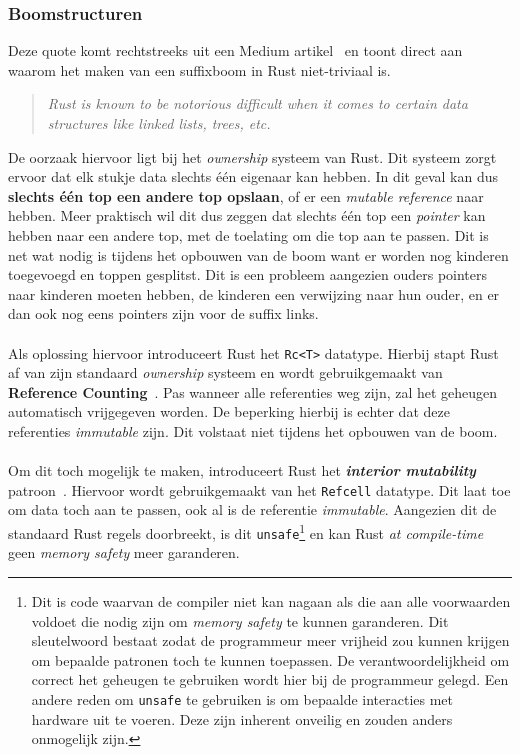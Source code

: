\subsubsection{Boomstructuren}
Deze quote komt rechtstreeks uit een Medium artikel~\cite{rust_difficulty_quote} en toont direct aan waarom het maken van een suffixboom in Rust niet-triviaal is.
\begin{quote}
    \textit{Rust is known to be notorious difficult when it comes to certain data structures like linked lists, trees, etc.}
\end{quote}
De oorzaak hiervoor ligt bij het \textit{ownership} systeem van Rust.
Dit systeem zorgt ervoor dat elk stukje data slechts één eigenaar kan hebben.
In dit geval kan dus \textbf{slechts één top een andere top opslaan}, of er een \textit{mutable reference} naar hebben.
Meer praktisch wil dit dus zeggen dat slechts één top een \textit{pointer} kan hebben naar een andere top, met de toelating om die top aan te passen.
Dit is net wat nodig is tijdens het opbouwen van de boom want er worden nog kinderen toegevoegd en toppen gesplitst.
Dit is een probleem aangezien ouders pointers naar kinderen moeten hebben, de kinderen een verwijzing naar hun ouder, en er dan ook nog eens pointers zijn voor de suffix links.
\\ \\
Als oplossing hiervoor introduceert Rust het \texttt{Rc<T>} datatype.
Hierbij stapt Rust af van zijn standaard \textit{ownership} systeem en wordt gebruikgemaakt van \textbf{Reference Counting}~\cite{reference_counting}.
Pas wanneer alle referenties weg zijn, zal het geheugen automatisch vrijgegeven worden.
De beperking hierbij is echter dat deze referenties \textit{immutable} zijn.
Dit volstaat niet tijdens het opbouwen van de boom.
\\ \\
Om dit toch mogelijk te maken, introduceert Rust het \textbf{\textit{interior mutability}} patroon~\cite{interior_mutability}.
Hiervoor wordt gebruikgemaakt van het \texttt{Refcell} datatype.
Dit laat toe om data toch aan te passen, ook al is de referentie \textit{immutable}.
Aangezien dit de standaard Rust regels doorbreekt, is dit \texttt{unsafe}\footnote{Dit is code waarvan de compiler niet kan nagaan als die aan alle voorwaarden voldoet die nodig zijn om \textit{memory safety} te kunnen garanderen. Dit sleutelwoord bestaat zodat de programmeur meer vrijheid zou kunnen krijgen om bepaalde patronen toch te kunnen toepassen. De verantwoordelijkheid om correct het geheugen te gebruiken wordt hier bij de programmeur gelegd. Een andere reden om \texttt{unsafe} te gebruiken is om bepaalde interacties met hardware uit te voeren. Deze zijn inherent onveilig en zouden anders onmogelijk zijn.} en kan Rust \textit{at compile-time} geen \textit{memory safety} meer garanderen.
